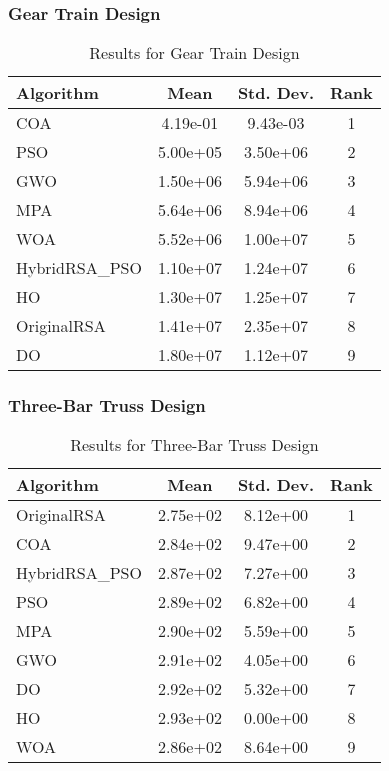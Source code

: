 \documentclass[12pt]{article}
\begin{document}
\subsubsection{Gear Train Design}
\begin{table}[H]
\centering
\caption{Results for Gear Train Design}
\begin{tabular}{|l|c|c|c|}
\hline
\textbf{Algorithm} & \textbf{Mean} & \textbf{Std. Dev.} & \textbf{Rank} \\
\hline
COA & 4.19e-01 & 9.43e-03 & 1 \\
PSO & 5.00e+05 & 3.50e+06 & 2 \\
GWO & 1.50e+06 & 5.94e+06 & 3 \\
MPA & 5.64e+06 & 8.94e+06 & 4 \\
WOA & 5.52e+06 & 1.00e+07 & 5 \\
HybridRSA\_PSO & 1.10e+07 & 1.24e+07 & 6 \\
HO & 1.30e+07 & 1.25e+07 & 7 \\
OriginalRSA & 1.41e+07 & 2.35e+07 & 8 \\
DO & 1.80e+07 & 1.12e+07 & 9 \\
\hline
\end{tabular}
\end{table}

\subsubsection{Three-Bar Truss Design}
\begin{table}[H]
\centering
\caption{Results for Three-Bar Truss Design}
\begin{tabular}{|l|c|c|c|}
\hline
\textbf{Algorithm} & \textbf{Mean} & \textbf{Std. Dev.} & \textbf{Rank} \\
\hline
OriginalRSA & 2.75e+02 & 8.12e+00 & 1 \\
COA & 2.84e+02 & 9.47e+00 & 2 \\
HybridRSA\_PSO & 2.87e+02 & 7.27e+00 & 3 \\
PSO & 2.89e+02 & 6.82e+00 & 4 \\
MPA & 2.90e+02 & 5.59e+00 & 5 \\
GWO & 2.91e+02 & 4.05e+00 & 6 \\
DO & 2.92e+02 & 5.32e+00 & 7 \\
HO & 2.93e+02 & 0.00e+00 & 8 \\
WOA & 2.86e+02 & 8.64e+00 & 9 \\
\hline
\end{tabular}
\end{table}
\end{document}

